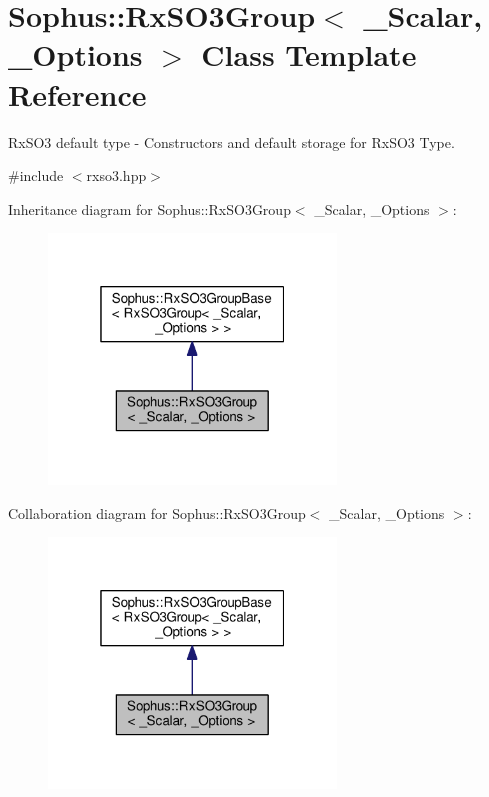 \hypertarget{class_sophus_1_1_rx_s_o3_group}{}\section{Sophus\+:\+:Rx\+S\+O3\+Group$<$ \+\_\+\+Scalar, \+\_\+\+Options $>$ Class Template Reference}
\label{class_sophus_1_1_rx_s_o3_group}


Rx\+S\+O3 default type -\/ Constructors and default storage for Rx\+S\+O3 Type.  




{\ttfamily \#include $<$rxso3.\+hpp$>$}



Inheritance diagram for Sophus\+:\+:Rx\+S\+O3\+Group$<$ \+\_\+\+Scalar, \+\_\+\+Options $>$\+:
\nopagebreak
\begin{figure}[H]
\begin{center}
\leavevmode
\includegraphics[width=217pt]{class_sophus_1_1_rx_s_o3_group__inherit__graph}
\end{center}
\end{figure}


Collaboration diagram for Sophus\+:\+:Rx\+S\+O3\+Group$<$ \+\_\+\+Scalar, \+\_\+\+Options $>$\+:
\nopagebreak
\begin{figure}[H]
\begin{center}
\leavevmode
\includegraphics[width=217pt]{class_sophus_1_1_rx_s_o3_group__coll__graph}
\end{center}
\end{figure}
